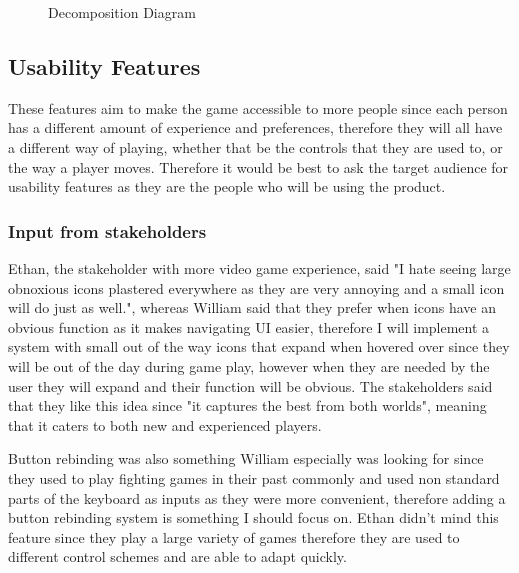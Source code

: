 \documentclass{article}
\newcommand{\parBr}{\vspace{5mm}}%
\begin{document}
\begin{landscape}
\begin{figure}[p]
\caption{Decomposition Diagram}
\label{decomp}
\end{figure}
\end{landscape}

\subsection{Usability Features}
These features aim to make the game accessible to more people since each person has a different amount of experience and preferences, therefore they will all have a different way of playing, whether that be the controls that they are used to, or the way a player moves. Therefore it would be best to ask the target audience for usability features as they are the people who will be using the product.

\subsubsection{Input from stakeholders}
Ethan, the stakeholder with more video game experience, said "I hate seeing large obnoxious icons plastered everywhere as they are very annoying and a small icon will do just as well.", whereas William said that they prefer when icons have an obvious function as it makes navigating UI easier, therefore I will implement a system with small out of the way icons that expand when hovered over since they will be out of the day during game play, however when they are needed by the user they will expand and their function will be obvious. The stakeholders said that they like this idea since "it captures the best from both worlds", meaning that it caters to both new and experienced players.

\parBr

Button rebinding was also something William especially was looking for since they used to play fighting games in their past commonly and used non standard parts of the keyboard as inputs as they were more convenient, therefore adding a button rebinding system is something I should focus on. Ethan didn't mind  this feature since they play a large variety of games therefore they are used to different control schemes and are able to adapt quickly.
\end{document}
